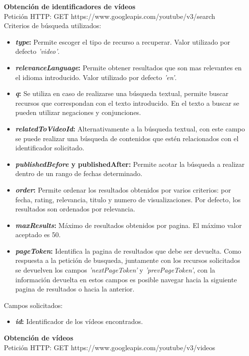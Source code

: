 \documentclass[11pt,a4paper]{article}
\begin{document}
\noindent\textbf{Obtención de identificadores de vídeos}\\
Petición HTTP: GET https://www.googleapis.com/youtube/v3/search\\

Criterios de búsqueda utilizados:
\begin{itemize}
\item \textbf{\textit{type}:} Permite escoger el tipo de recurso a recuperar. Valor utilizado por defecto \textit{'video'}.
\item \textbf{\textit{relevanceLanguage}:} Permite obtener resultados que son mas relevantes en el idioma introducido. Valor utilizado por defecto \textit{'en'}.
\item \textbf{\textit{q}:} Se utiliza en caso de realizarse una búsqueda textual, permite buscar recursos que correspondan con el texto introducido. En el texto a buscar se pueden utilizar negaciones y conjunciones.
\item \textbf{\textit{relatedToVideoId}:} Alternativamente a la búsqueda textual, con este campo se puede realizar una búsqueda de contenidos que estén relacionados con el identificador solicitado.
\item \textbf{\textit{publishedBefore} y publishedAfter:} Permite acotar la búsqueda a realizar dentro de un rango de fechas determinado. 
\item \textbf{\textit{order}:} Permite ordenar los resultados obtenidos por varios criterios: por fecha, rating, relevancia, titulo y numero de visualizaciones. Por defecto, los resultados son ordenados por relevancia.
\item \textbf{\textit{maxResults}:} Máximo de resultados obtenidos por pagina. El máximo valor aceptado es 50.
\item \textbf{\textit{pageToken}:} Identifica la pagina de resultados que debe ser devuelta. Como respuesta a la petición de busqueda, juntamente con los recursos solicitados se devuelven los campos \textit{'nextPageToken'} y \textit{'prevPageToken'}, con la información devuelta en estos campos es posible navegar hacia la siguiente pagina de resultados o hacia la anterior.
\end{itemize}

Campos solicitados:
\begin{itemize}
\item \textbf{\textit{id}:} Identificador de los vídeos encontrados.
\end{itemize}
\medskip 

\noindent\textbf{Obtención de vídeos}\\
Petición HTTP: GET https://www.googleapis.com/youtube/v3/videos\\
\end{document}
